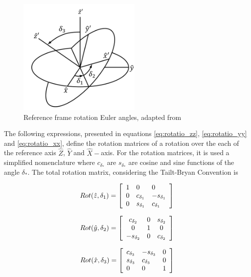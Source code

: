 \begin{figure}[!htb]
    \centering
    \includegraphics[width=6cm]{Figures/background/rotation_matrices/rotation_frames.png}
    \caption{Reference frame rotation Euler angles, adapted from \cite{schwab_how_2006}}
    \label{fig:rotation_frames_img}
\end{figure}

The following expressions, presented in equations \ref{eq:rotatio_zz}, \ref{eq:rotatio_yy} and \ref{eq:rotatio_xx}, define the rotation matrices of a rotation over the each of the reference axis $\hat{Z}$, $\hat{Y}$ and $\hat{X}-$axis. For the rotation matrices, it is used a simplified nomenclature where $c_{\delta_{*}}$ are $s_{\delta_{*}}$ are cosine and sine functions of the angle $\delta_{*}$. The total rotation matrix, considering the Tailt-Bryan Convention is

\begin{equation}
    {R o t({\hat{z}},\delta_1)}={\left[\begin{array}{l l l}{1}&{0}&{0}\\ {0}&{c_{\delta_1}}&{-s_{\delta_1}}\\ {0}&{s_{\delta_1}}&{c_{\delta_1}}\end{array}\right]}
    \label{eq:rotatio_zz}
\end{equation}

\begin{equation}
    Rot(\hat{y},\delta_2)=\left[\begin{array}{c c c}{{c_{\delta_2}}}&{{0}}&{{s_{\delta_2}}}\\ {{0}}&{{1}}&{{0}}\\ {{-s_{\delta_2}}}&{{0}}&{{c_{\delta_2}}}\end{array}\right]
    \label{eq:rotatio_yy}
\end{equation}

\begin{equation}
    Rot({\hat{x}},{\delta_3})={\left[\begin{array}{l l l}{{{c}_{\delta_3}}}&{{-{s}_{\delta_3}}}&{{0}}\\ {{{s}_{\delta_3}}}&{{{c}_{\delta_3}}}&{{0}}\\ {{0}}&{{0}}&{{1}}\end{array}\right]}
        \label{eq:rotatio_xx} 
\end{equation}


